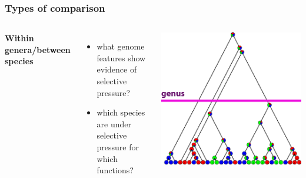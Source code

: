 %
\begin{frame}
  \frametitle{Types of comparison}
    \begin{columns}[T] 
        \textcolor{RawSienna}{\textbf{Within genera/between species}}
        \begin{itemize}
	  \item what genome features show evidence of selective pressure?
	  \item which species are under selective pressure for which functions?        
        \end{itemize}
        \includegraphics[width=\textwidth]{images/cladogram_genus}
    \end{columns}  
\end{frame}


